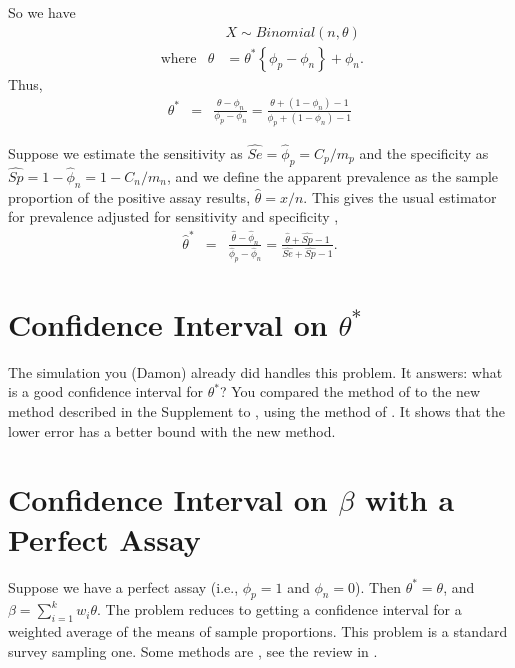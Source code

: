 \documentclass{article}
\begin{document}
So we have
\begin{eqnarray*}
& & X \sim Binomial \left(n, \theta \right)  \\
\mbox{ where} & \theta & = \theta^* \left\{ \phi_p - \phi_n \right\} + \phi_n.
\end{eqnarray*}
Thus,
\begin{eqnarray}
\theta^* & =  & \frac{ \theta - \phi_n }{ \phi_p - \phi_n}  = \frac{ \theta + (1 - \phi_n) -1  }{ \phi_p + (1 - \phi_n) -1 } \label{eq:thetastar}
\end{eqnarray}

Suppose we estimate the sensitivity as $\widehat{Se} = \hat{\phi}_p = C_p/m_p$ and the specificity as $\widehat{Sp} = 1-\hat{\phi}_n = 1- C_n/m_n$,
and we define the apparent prevalence as the sample proportion of the positive assay results, $\hat{\theta} = x/n$.
This gives the usual estimator for  prevalence adjusted for sensitivity and specificity
 \citep[see e.g.,][]{Roga:1978},
\begin{eqnarray*}
\hat{\theta}^* & = & \frac{ \hat{\theta} - \hat{\phi}_n }{\hat{\phi}_p - \hat{\phi}_n} = \frac{ \hat{\theta} + \widehat{Sp} -1 }{\widehat{Se} + \widehat{Sp} -1}.
\end{eqnarray*}


\section{Confidence Interval on $\theta^*$}
\label{sec-thetastar}

The simulation you (Damon) already did handles this problem. It answers: what is a good confidence interval for $\theta^*$?
You compared the method of \citet{Lang:2014} to the new method described in the Supplement to \citet{Kali:2021}, using the method of \citet{FayP:2015}.
It shows that the lower error has a better bound with the new method.

\section{Confidence Interval on $\beta$ with a Perfect Assay}
\label{sec-betaPerfect}


Suppose we have a perfect assay (i.e., $\phi_p=1$ and $\phi_n=0$). Then $\theta^* = \theta$, and $\beta = \sum_{i=1}^{k} w_i \theta$.
The problem reduces to getting a confidence interval for a weighted average of the means of sample proportions.
This problem is a standard survey sampling one. Some methods are \citet{Korn:1998}, see the review in \citet{Dean:2015}.
\end{document}
